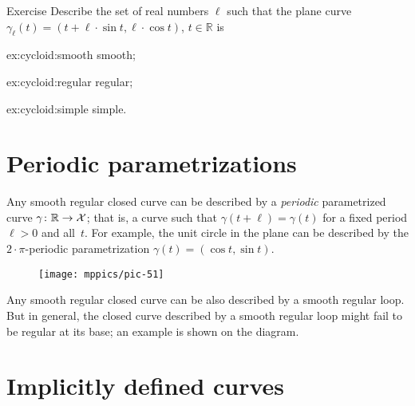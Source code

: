 \begin{thm}{Exercise}\label{ex:cycloid}
Describe the set of real numbers $\ell$
such that the plane curve $\gamma_\ell (t)= (t+\ell \cdot \sin t,\ell \cdot \cos t)$, $t\in\mathbb{R}$ is

\begin{minipage}{.30\textwidth}
\begin{subthm}{ex:cycloid:smooth}
smooth; 
\end{subthm}
\end{minipage}
\hfill
\begin{minipage}{.30\textwidth}
\begin{subthm}{ex:cycloid:regular}
regular;
\end{subthm}
\end{minipage}
\hfill
\begin{minipage}{.30\textwidth}
\begin{subthm}{ex:cycloid:simple}
simple.
\end{subthm}
\end{minipage}

\end{thm}

\section{Periodic parametrizations}

Any smooth regular closed curve can be described by a {}\emph{periodic} parametrized curve $\gamma\colon \mathbb{R}\to \mathcal{X}$;
that is, a curve such that $\gamma(t+\ell)=\gamma(t)$ for a fixed period $\ell>0$ and all~$t$.
For example, the unit circle in the plane can be described by the $2{\cdot}\pi$-periodic parametrization $\gamma(t)=(\cos t,\sin t)$.

{

\begin{wrapfigure}{o}{17 mm}
\vskip-2mm
\centering
\texttt{[image: mppics/pic-51]}
\end{wrapfigure}

Any smooth regular closed curve can be also described by a smooth regular loop.
But in general, the closed curve described by a smooth regular loop might fail to be regular at its base; an example is shown on the diagram.

}

\section{Implicitly defined curves}\label{sec:implicit-curves}

